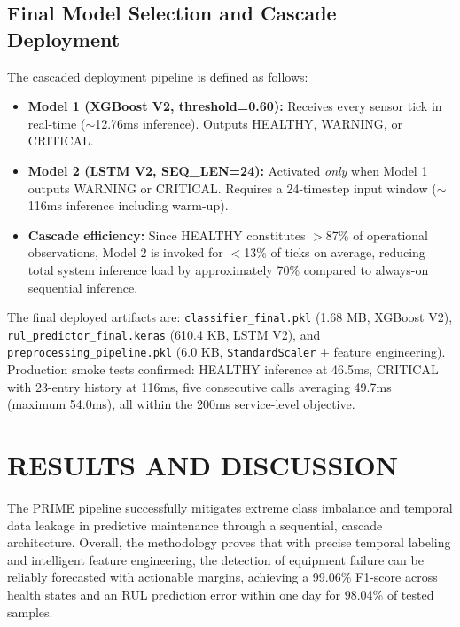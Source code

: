 \documentclass[conference]{IEEEtran}
\begin{document}
\subsection{Final Model Selection and Cascade Deployment}

The cascaded deployment pipeline is defined as follows:
\begin{itemize}
\item \textbf{Model 1 (XGBoost V2, threshold=0.60):} Receives every sensor tick in real-time ($\sim$12.76ms inference). Outputs HEALTHY, WARNING, or CRITICAL.
\item \textbf{Model 2 (LSTM V2, SEQ\_LEN=24):} Activated \textit{only} when Model 1 outputs WARNING or CRITICAL. Requires a 24-timestep input window ($\sim$116ms inference including warm-up).
\item \textbf{Cascade efficiency:} Since HEALTHY constitutes $>$87\% of operational observations, Model 2 is invoked for $<$13\% of ticks on average, reducing total system inference load by approximately 70\% compared to always-on sequential inference.
\end{itemize}

The final deployed artifacts are: \texttt{classifier\_final.pkl} (1.68 MB, XGBoost V2), \texttt{rul\_predictor\_final.keras} (610.4 KB, LSTM V2), and \texttt{preprocessing\_pipeline.pkl} (6.0 KB, \texttt{StandardScaler} + feature engineering). Production smoke tests confirmed: HEALTHY inference at 46.5ms, CRITICAL with 23-entry history at 116ms, five consecutive calls averaging 49.7ms (maximum 54.0ms), all within the 200ms service-level objective.

\section{RESULTS AND DISCUSSION}

The PRIME pipeline successfully mitigates extreme class imbalance \cite{xu2026predictive} and temporal data leakage in predictive maintenance through a sequential, cascade architecture. Overall, the methodology proves that with precise temporal labeling and intelligent feature engineering, the detection of equipment failure can be reliably forecasted with actionable margins, achieving a 99.06\% F1-score across health states and an RUL prediction error within one day for 98.04\% of tested samples.
\end{document}
